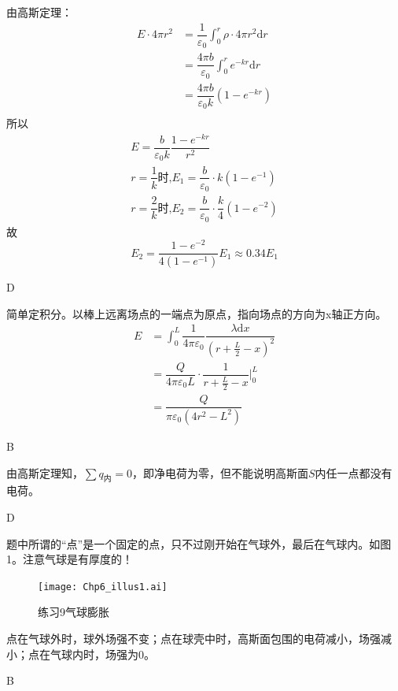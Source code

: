 \documentclass[b5paper,opensource,sourcefont,parskip]{qyxf-book}
\newcommand{\di}[1]{\mathrm{d}#1}
\begin{document}
\solve
由高斯定理：
\begin{align*}
	E\cdot 4\pi r^2&=\dfrac{1}{\varepsilon_0}\int_0^r\rho\cdot 4\pi r^2\di{r}\\
	&=\dfrac{4\pi b}{\varepsilon_0}\int_0^r e^{-kr}\di{r}\\
	&=\dfrac{4\pi b}{\varepsilon_0 k}(1-e^{-kr})\\
\end{align*}
所以
\begin{gather*}
	E=\dfrac{b}{\varepsilon_0 k}\dfrac{1-e^{-kr}}{r^2}\\
	r=\dfrac{1}{k}\textbf{时,}E_1=\dfrac{b}{\varepsilon_0}\cdot k(1-e^{-1})\\
	r=\dfrac{2}{k}\textbf{时,}E_2=\dfrac{b}{\varepsilon_0}\cdot \dfrac{k}{4}(1-e^{-2})
\end{gather*}
故
\begin{equation*}
	E_2=\dfrac{1-e^{-2}}{4(1-e^{-1})}E_1\approx 0.34E_1
\end{equation*}

D

\solve
简单定积分。以棒上远离场点的一端点为原点，指向场点的方向为x轴正方向。
\begin{align*}
	E&=\int_{0}^{L}\dfrac{1}{4\pi \varepsilon_0}\dfrac{\lambda\di{x}}{{(r+\frac{L}{2}-x)}^2}\\
	&=\dfrac{Q}{4\pi \varepsilon_0 L}\cdot \dfrac{1}{{r+\frac{L}{2}-x}}\bigg|_0^L\\
	&=\dfrac{Q}{\pi \varepsilon_0(4r^2-L^2)}
\end{align*}

B

\solve
由高斯定理知，$\sum q_{\text{内}}=0$，即净电荷为零，但不能说明高斯面$S$内任一点都没有电荷。

D

\solve
题中所谓的“点”是一个固定的点，只不过刚开始在气球外，最后在气球内。如图1。注意气球是有厚度的！
\begin{figure}[!htbp]
	\centering
	\texttt{[image: Chp6\_illus1.ai]}
	\caption{练习9\quad 气球膨胀}
\end{figure}
点在气球外时，球外场强不变；点在球壳中时，高斯面包围的电荷减小，场强减小；点在气球内时，场强为0。

B
\end{document}
